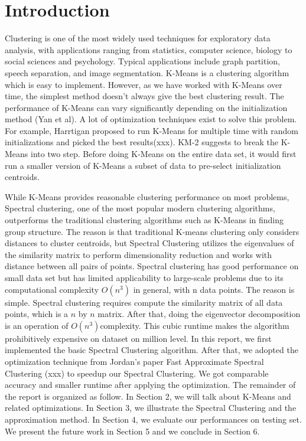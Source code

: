 \documentclass{acm_proc_article-sp}
\begin{document}
\section{Introduction}
Clustering is one of the most widely used techniques for exploratory data analysis,  with applications ranging from statistics, computer science, biology to social sciences and psychology. Typical applications include graph partition, speech separation, and image segmentation. K-Means is a  
clustering algorithm which is easy to implement. However, as we have worked with K-Means over time, the simplest method doesn’t always give the best clustering result. The performance of K-Means can vary significantly depending on the initialization method (Yan et al). A lot of optimization techniques exist to solve this problem. For example, Harrtigan proposed to run K-Means for multiple time with random initializations and picked the best results(xxx). KM-2 suggests to break the K-Means into two step. Before doing K-Means on the entire data set, it would first run a smaller version of K-Means a subset of data to pre-select initialization centroids. 

While K-Means provides reasonable clustering performance on most problems, 
Spectral clustering, one of the most popular modern clustering algorithms, outperforms the traditional clustering algorithms such as K-Means in finding group structure. The reason is that traditional K-means clustering only considers distances to cluster centroids, but Spectral Clustering utilizes the eigenvalues of the similarity matrix to perform dimensionality reduction and works with distance between all pairs of points. Spectral clustering has good performance on small data set but has limited applicability to large-scale problems due to its computational complexity $O(n^3)$ in general, with n data points. The reason is simple. Spectral clustering requires compute the similarity matrix of all data points, which is a $n$ by $n$ matrix. After that, doing the eigenvector decomposition is an operation of 
$O(n^3)$complexity. This cubic runtime makes the algorithm prohibitively expensive on dataset on million level. In this report, we  first implemented the basic Spectral Clustering algorithm. After that, we adopted the optimization technique from Jordan’s paper Fast Approximate Spectral Clustering (xxx) to speedup our Spectral Clustering. We got comparable accuracy and smaller runtime after applying the optimization. The remainder of the report is organized as follow. In Section 2, we will talk about K-Means and related optimizations. In Section 3, we illustrate the Spectral Clustering and the approximation method. In Section 4, we evaluate our performances on testing set. We present the future work in Section 5 and we conclude in Section 6.
\end{document}
